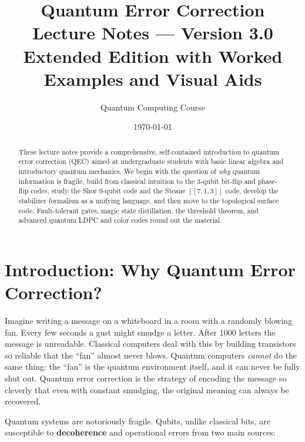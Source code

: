 \documentclass[11pt, a4paper]{article}
\title{%
  \textbf{Quantum Error Correction}\\[6pt]
  \large Lecture Notes --- Version 3.0\\[4pt]
  \normalsize Extended Edition with Worked Examples and Visual Aids
}
\author{Quantum Computing Course}
\date{\today}
\theoremstyle{definition}
\theoremstyle{plain}
\theoremstyle{remark}
\newcommand{\code}[1]{[\![#1]\!]}
\begin{document}
\maketitle

\begin{abstract}
These lecture notes provide a comprehensive, self-contained introduction to
quantum error correction (QEC) aimed at undergraduate students with basic
linear algebra and introductory quantum mechanics.  We begin with the
question of \emph{why} quantum information is fragile, build from classical
intuition to the 3-qubit bit-flip and phase-flip codes, study the Shor
9-qubit code and the Steane $\code{7,1,3}$ code, develop the stabilizer
formalism as a unifying language, and then move to the topological surface
code.  Fault-tolerant gates, magic state distillation, the threshold theorem,
and advanced quantum LDPC and color codes round out the material.


\end{abstract}

\tableofcontents
\newpage

\section{Introduction: Why Quantum Error Correction?}
\label{sec:intro}

\begin{intuition}
Imagine writing a message on a whiteboard in a room with a randomly blowing
fan.  Every few seconds a gust might smudge a letter.  After 1000 letters the
message is unreadable.  Classical computers deal with this by building
transistors so reliable that the ``fan'' almost never blows.  Quantum
computers \emph{cannot} do the same thing: the ``fan'' is the quantum
environment itself, and it can never be fully shut out.  Quantum error
correction is the strategy of encoding the message so cleverly that even with
constant smudging, the original meaning can always be recovered.
\end{intuition}

Quantum systems are notoriously fragile.  Qubits, unlike classical bits, are
susceptible to \textbf{decoherence} and operational errors from two main
sources:
\end{document}
